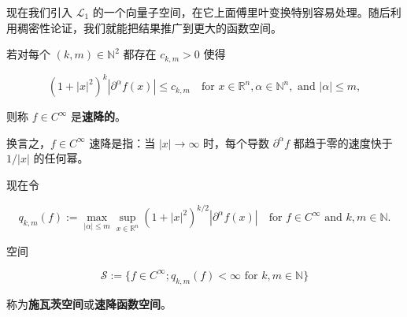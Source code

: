 现在我们引入 $ \mathcal{L}_1 $ 的一个向量子空间，在它上面傅里叶变换特别容易处理。随后利用稠密性论证，我们就能把结果推广到更大的函数空间。

若对每个 $ (k,m) \in \mathbb{N}^2 $ 都存在 $ c_{k,m} > 0 $ 使得

\[
(1+|x|^2)^k|\partial^{\alpha}f(x)| \le c_{k,m} \quad \text{for } x \in \mathbb{R}^n, \alpha \in \mathbb{N}^n, \text{ and } |\alpha| \le m ,
\]

则称 $ f \in C^{\infty} $ 是\textbf{速降的}。

换言之，$ f \in C^{\infty} $ 速降是指：当 $ |x| \to \infty $ 时，每个导数 $ \partial^{\alpha}f $ 都趋于零的速度快于 $ 1/|x| $ 的任何幂。

现在令

\[
q_{k,m}(f) := \max_{|\alpha| \le m}\sup_{x \in \mathbb{R}^n}(1+|x|^2)^{k/2}|\partial^{\alpha}f(x)| \quad \text{for } f \in C^{\infty} \text{ and } k,m \in \mathbb{N} .
\]

空间

\[
\mathcal{S} := \{ f \in C^{\infty} ; q_{k,m}(f) < \infty \text{ for } k,m \in \mathbb{N} \}
\]

称为\textbf{施瓦茨空间}或\textbf{速降函数空间}。

